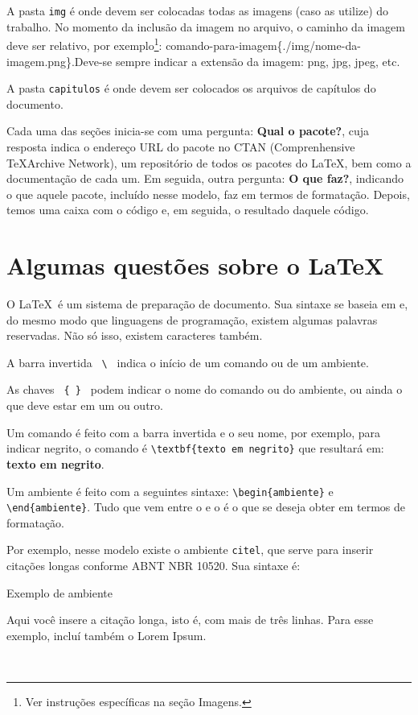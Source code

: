 A pasta \verb|img| é onde devem ser colocadas todas as imagens (caso as utilize) do trabalho. No momento da inclusão da imagem no arquivo, o caminho da imagem deve ser relativo, por exemplo\footnote{Ver instruções específicas na seção Imagens.}: comando-para-imagem\{./img/nome-da-imagem.png\}.Deve-se sempre  indicar a extensão da imagem: png, jpg, jpeg, etc.

A pasta \verb|capitulos| é onde devem ser colocados os arquivos de capítulos do documento.

Cada uma das seções inicia-se com uma pergunta: \textbf{Qual o pacote?}, cuja resposta indica o endereço URL do pacote no CTAN (Comprenhensive \TeX Archive Network), um repositório de todos os pacotes do \LaTeX, bem como a documentação de cada um. Em seguida, outra pergunta: \textbf{O que faz?}, indicando o que aquele pacote, incluído nesse modelo, faz em termos de formatação. Depois, temos uma caixa com o código e, em seguida, o resultado daquele código.

\section{Algumas questões sobre o \LaTeX}

O \LaTeX\ é um sistema de preparação de documento. Sua sintaxe se baseia em  e, do mesmo modo que linguagens de programação, existem algumas palavras reservadas. Não só isso, existem caracteres  também.

A barra invertida \verb| \ | indica o início de um comando ou de um ambiente.

As chaves \verb| { } | podem indicar o nome do comando ou do ambiente, ou ainda o que deve estar em um ou outro.

Um comando é feito com a barra invertida e o seu nome, por exemplo, para indicar negrito, o comando é \verb|\textbf{texto em negrito}| que resultará em: \textbf{texto em negrito}.

Um ambiente é feito com a seguintes sintaxe: \verb|\begin{ambiente}| e \verb|\end{ambiente}|. Tudo que vem entre o  e o  é o que se deseja obter em termos de formatação. 

Por exemplo, nesse modelo existe o ambiente \verb|citel|, que serve para inserir citações longas conforme ABNT NBR 10520. Sua sintaxe é:
\ \\

\begin{codex}{Exemplo de ambiente}
\begin{citel}
Aqui você insere a citação longa, isto é, com mais de três linhas.
Para esse exemplo, incluí também o Lorem Ipsum. \lipsum[1]
\end{citel}
\end{codex}
\ \\

